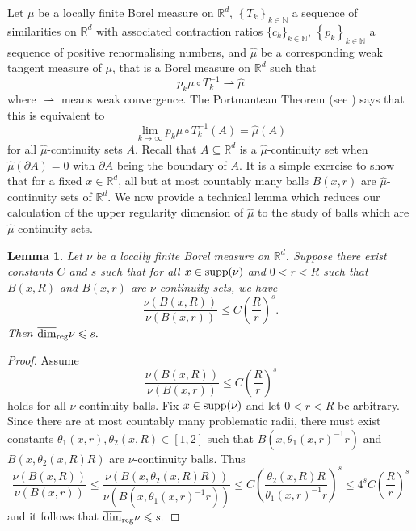 \documentclass[12pt]{amsart}
\numberwithin{equation}{section}
\newtheorem{lma}[thm]{Lemma}
\renewcommand{\le}{\leqslant}
\renewcommand{\leq}{\leqslant}
\begin{document}
Let $\mu$ be a locally finite Borel measure on $\mathbb{R}^d$, $\left\{T_k\right\}_{k\in \mathbb{N}}$ a sequence of similarities on $\mathbb{R}^d$ with associated contraction ratios $\{c_k\}_{k\in \mathbb{N}}$, $\left\{p_k\right\}_{k\in \mathbb{N}}$ a sequence of positive renormalising numbers, and $\hat{\mu}$ be a corresponding weak tangent measure of $\mu$, that is a Borel measure on $\mathbb{R}^d$ such that 
\[
p_k \mu \circ T^{-1}_k \rightharpoonup \hat{\mu}
\]
where $\rightharpoonup$ means weak convergence. The Portmanteau Theorem (see \cite[Theorem 1.24]{mattila}) says that this is equivalent to 
\[
\lim_{k\rightarrow \infty} p_k \mu \circ T^{-1}_k (A) =\hat{\mu}(A)
\]
for all $\hat{\mu}$-continuity sets $A$.  Recall that  $A\subseteq \mathbb{R}^d$ is a $\hat{\mu}$-continuity set when $\hat{\mu}(\partial A) = 0$ with $\partial A$ being the boundary of $A$. It is a simple exercise to show that for a fixed $x \in \mathbb{R}^d$, all but at most countably many balls $B(x,r)$ are $\hat{\mu}$-continuity sets of $\mathbb{R}^d$. We now provide a technical lemma which reduces our calculation of the upper regularity dimension of $\hat \mu$ to the study of balls which are $\hat{\mu}$-continuity sets.

\begin{lma}
Let $\nu$ be a locally finite Borel measure  on $ \mathbb{R}^d$. Suppose there exist constants $C$ and $s$ such that for all $x\in \textup{supp}(\nu)$ and $0<r<R$ such that $B(x,R)$ and $B(x,r)$ are $\nu$-continuity sets, we have
\[
\frac{\nu(B(x,R))}{\nu(B(x,r))} \leq C\left(\frac{R}{r}\right)^{s}.
\]
Then $\overline{\dim}_{\textup{reg}}  \nu \le s.$
\end{lma}

\begin{proof}
Assume 
\[
\frac{\nu(B(x,R))}{\nu(B(x,r))} \leq C\left(\frac{R}{r}\right)^{s}
\]
holds for all $\nu$-continuity balls. Fix $x  \in \textup{supp}(\nu)$ and let $0<r<R$ be arbitrary. Since there are at most countably many problematic radii, there must exist constants $\theta_1(x,r),\theta_2(x,R)\in[1,2]$ such that $B(x,\theta_1(x,r)^{-1}r)$ and $B(x,\theta_2(x,R) R)$ are $\nu$-continuity balls. Thus
\[
\frac{\nu(B(x,R))}{\nu(B(x,r))} \leq \frac{\nu(B(x,\theta_2(x,R)R))}{\nu(B(x,\theta_1(x,r)^{-1}r))} \le   C\left(\frac{\theta_2(x,R)R}{\theta_1(x,r)^{-1}r}\right)^{s} \le 4^s C \left(\frac{R}{r}\right)^{s}
\]
and it follows that $\overline{\dim}_{\textup{reg}}  \nu \le s.$
\end{proof}
\end{document}
